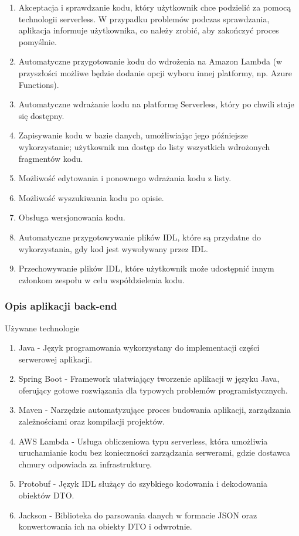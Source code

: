 \documentclass[runningheads,12pt]{llncs}
\begin{document}
\begin{enumerate}
    \item Akceptacja i sprawdzanie kodu, który użytkownik chce podzielić za pomocą technologii serverless. W przypadku problemów podczas sprawdzania, aplikacja informuje użytkownika, co należy zrobić, aby zakończyć proces pomyślnie.
    \item Automatyczne przygotowanie kodu do wdrożenia na Amazon Lambda (w przyszłości możliwe będzie dodanie opcji wyboru innej platformy, np. Azure Functions).
    \item Automatyczne wdrażanie kodu na platformę Serverless, który po chwili staje się dostępny.
    \item Zapisywanie kodu w bazie danych, umożliwiając jego późniejsze wykorzystanie; użytkownik ma dostęp do listy wszystkich wdrożonych fragmentów kodu.
    \item Możliwość edytowania i ponownego wdrażania kodu z listy.
    \item Możliwość wyszukiwania kodu po opisie.
    \item Obsługa wersjonowania kodu.
    \item Automatyczne przygotowywanie plików IDL, które są przydatne do wykorzystania, gdy kod jest wywoływany przez IDL.
    \item Przechowywanie plików IDL, które użytkownik może udostępnić innym członkom zespołu w celu współdzielenia kodu.
\end{enumerate}

\subsubsection{Opis aplikacji back-end}

Używane technologie

\begin{enumerate}
    \item Java - Język programowania wykorzystany do implementacji części serwerowej aplikacji.
    \item Spring Boot - Framework ułatwiający tworzenie aplikacji w języku Java, oferujący gotowe rozwiązania dla typowych problemów programistycznych.
    \item Maven - Narzędzie automatyzujące proces budowania aplikacji, zarządzania zależnościami oraz kompilacji projektów.
    \item AWS Lambda - Usługa obliczeniowa typu serverless, która umożliwia uruchamianie kodu bez konieczności zarządzania serwerami, gdzie dostawca chmury odpowiada za infrastrukturę.
    \item Protobuf - Język IDL służący do szybkiego kodowania i dekodowania obiektów DTO.
    \item Jackson - Biblioteka do parsowania danych w formacie JSON oraz konwertowania ich na obiekty DTO i odwrotnie.
\end{enumerate}
\end{document}
